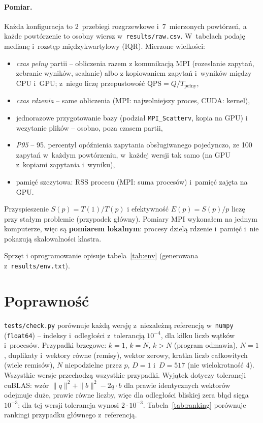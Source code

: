\documentclass[11pt,a4paper]{article}
\begin{document}
\paragraph{Pomiar.} Każda konfiguracja to 2~przebiegi rozgrzewkowe i~7~mierzonych powtórzeń, a każde powtórzenie to osobny wiersz w~\texttt{results/raw.csv}. W~tabelach podaję medianę i~rozstęp międzykwartylowy (IQR). Mierzone wielkości:
\begin{itemize}
\item \emph{czas pełny} partii -- obliczenia razem z komunikacją MPI (rozesłanie zapytań, zebranie wyników, scalanie) albo z kopiowaniem zapytań i~wyników między CPU i~GPU; z~niego liczę przepustowość $\mathrm{QPS}=Q/T_\text{pełny}$,
\item \emph{czas rdzenia} -- same obliczenia (MPI: najwolniejszy proces, CUDA: kernel),
\item jednorazowe przygotowanie bazy (podział \texttt{MPI\_Scatterv}, kopia na GPU) i wczytanie plików -- osobno, poza czasem partii,
\item \emph{P95} -- 95. percentyl opóźnienia zapytania obsługiwanego pojedynczo, ze 100 zapytań w~każdym powtórzeniu, w~każdej wersji tak samo (na GPU z~kopiami zapytania i~wyniku),
\item pamięć szczytowa: RSS procesu (MPI: suma procesów) i~pamięć zajęta na GPU.
\end{itemize}
Przyspieszenie $S(p)=T(1)/T(p)$ i efektywność $E(p)=S(p)/p$ liczę przy stałym problemie (przypadek główny). Pomiary MPI wykonałem na jednym komputerze, więc są \textbf{pomiarem lokalnym}: procesy dzielą rdzenie i~pamięć i~nie pokazują skalowalności klastra.

Sprzęt i oprogramowanie opisuje tabela~\ref{tab:env} (generowana z~\texttt{results/env.txt}).
\begin{table}[H]
\centering\footnotesize
\caption{Środowisko pomiarów.}\label{tab:env}

\end{table}

\section{Poprawność}
\texttt{tests/check.py} porównuje każdą wersję z~niezależną referencją w~\texttt{numpy} (\texttt{float64}) -- indeksy i~odległości z~tolerancją $10^{-4}$, dla kilku liczb wątków i~procesów. Przypadki brzegowe: $k=1$, $k=N$, $k>N$ (program odmawia), $N=1$, duplikaty i~wektory równe (remisy), wektor zerowy, kratka liczb całkowitych (wiele remisów), $N$ niepodzielne przez $p$, $D=1$ i~$D=517$ (nie wielokrotność 4). Wszystkie wersje przechodzą wszystkie przypadki. Wyjątek dotyczy tolerancji cuBLAS: wzór $\|q\|^2+\|b\|^2-2q\cdot b$ dla prawie identycznych wektorów odejmuje duże, prawie równe liczby, więc dla odległości bliskiej zera błąd sięga $10^{-3}$; dla tej wersji tolerancja wynosi $2\cdot10^{-3}$. Tabela~\ref{tab:ranking} porównuje rankingi przypadku głównego z~referencją.
\end{document}
